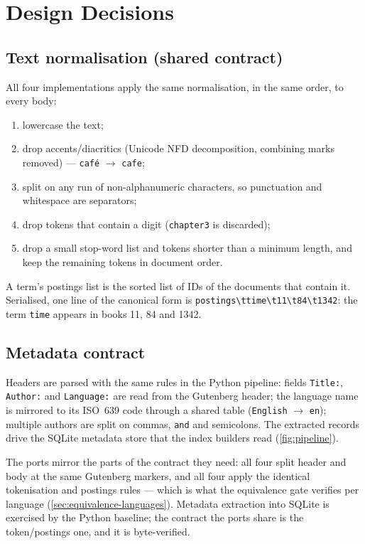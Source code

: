 \section{Design Decisions}
\label{sec:design}

\subsection{Text normalisation (shared contract)}
\label{sec:normalisation}

All four implementations apply the same normalisation, in the same order, to
every body:

\begin{enumerate}
    \item lowercase the text;
    \item drop accents/diacritics (Unicode NFD decomposition, combining marks
    removed) --- \texttt{café} $\rightarrow$ \texttt{cafe};
    \item split on any run of non-alphanumeric characters, so punctuation and
    whitespace are separators;
    \item drop tokens that contain a digit (\texttt{chapter3} is discarded);
    \item drop a small stop-word list and tokens shorter than a minimum
    length, and keep the remaining tokens in document order.
\end{enumerate}

A term's postings list is the sorted list of IDs of the documents that
contain it. Serialised, one line of the canonical form is
\texttt{postings\textbackslash ttime\textbackslash t11\textbackslash t84\textbackslash t1342}:
the term \texttt{time} appears in books 11, 84 and 1342.

\subsection{Metadata contract}
\label{sec:metadata-contract}

Headers are parsed with the same rules in the Python pipeline: fields
\texttt{Title:}, \texttt{Author:} and \texttt{Language:} are read from the
Gutenberg header; the language name is mirrored to its ISO~639 code through a
shared table (\texttt{English} $\rightarrow$ \texttt{en}); multiple authors
are split on commas, \texttt{and} and semicolons. The extracted records drive
the SQLite metadata store that the index builders read (\cref{fig:pipeline}).

The ports mirror the parts of the contract they need: all four split header
and body at the same Gutenberg markers, and all four apply the identical
tokenisation and postings rules --- which is what the equivalence gate
verifies per language (\cref{sec:equivalence-languages}). Metadata extraction
into SQLite is exercised by the Python baseline; the contract the ports share
is the token/postings one, and it is byte-verified.

